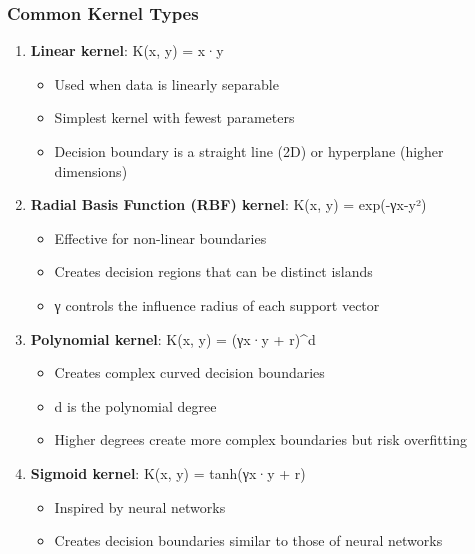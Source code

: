 \documentclass[
  letterpaper,
  DIV=11,
  numbers=noendperiod]{scrreprt}
\providecommand{\tightlist}{%
  \setlength{\itemsep}{0pt}\setlength{\parskip}{0pt}}\usepackage{longtable,booktabs,array}
\begin{document}
\subsubsection{Common Kernel Types}\label{common-kernel-types}

\begin{enumerate}
\def\labelenumi{\arabic{enumi}.}
\tightlist
\item
  \textbf{Linear kernel}: K(x, y) = x·y

  \begin{itemize}
  \tightlist
  \item
    Used when data is linearly separable
  \item
    Simplest kernel with fewest parameters
  \item
    Decision boundary is a straight line (2D) or hyperplane (higher
    dimensions)
  \end{itemize}
\item
  \textbf{Radial Basis Function (RBF) kernel}: K(x, y) =
  exp(-γ\textbar\textbar x-y\textbar\textbar²)

  \begin{itemize}
  \tightlist
  \item
    Effective for non-linear boundaries
  \item
    Creates decision regions that can be distinct islands
  \item
    γ controls the influence radius of each support vector
  \end{itemize}
\item
  \textbf{Polynomial kernel}: K(x, y) = (γx·y + r)\^{}d

  \begin{itemize}
  \tightlist
  \item
    Creates complex curved decision boundaries
  \item
    d is the polynomial degree
  \item
    Higher degrees create more complex boundaries but risk overfitting
  \end{itemize}
\item
  \textbf{Sigmoid kernel}: K(x, y) = tanh(γx·y + r)

  \begin{itemize}
  \tightlist
  \item
    Inspired by neural networks
  \item
    Creates decision boundaries similar to those of neural networks
  \end{itemize}
\end{enumerate}
\end{document}
